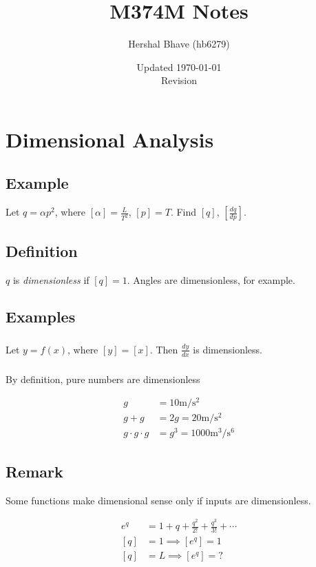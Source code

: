 \documentclass[12pt,twoside]{article}
\title{M374M Notes}
\author{Hershal Bhave (hb6279)}
\date{Updated \today \\ \normalsize{Revision }}
\begin{document}
\maketitle
\tableofcontents

\section{Dimensional Analysis}
\subsection{Example}
Let $q = \alpha p^2$, where $[\alpha] = \frac{L}{T^2}$, $[p] = T$. Find $[q]$,
$\left[\frac{dq}{dp}\right]$.

\subsection{Definition}
$q$ is \emph{dimensionless} if $[q] = 1$. Angles are dimensionless, for example.

\subsection{Examples}
\subsubsection{}
Let $y = f(x)$, where $[y] = [x]$. Then $\frac{dy}{dx}$ is dimensionless.

\subsubsection{}
By definition, pure numbers are dimensionless

\begin{equation}
  \begin{aligned}
    g &= 10 \text{m}/\text{s}^2 \\
    g + g &= 2g = 20 \text{m}/\text{s}^2 \\
    g \cdot g \cdot g & = g^3 = 1000 \text{m}^3/\text{s}^6
  \end{aligned}
\end{equation}

\subsection{Remark}
Some functions make dimensional sense only if inputs are dimensionless.

\begin{equation}
  \begin{aligned}
    e^q &= 1 + q + \frac{q^2}{2!} + \frac{q^3}{3!} + \cdots \\
    [q] &= 1 \implies [e^q] = 1 \\
    [q] &= L \implies [e^q] = ?
  \end{aligned}
\end{equation}
\end{document}
